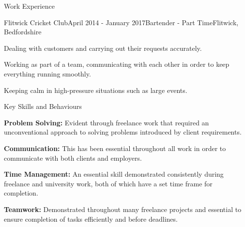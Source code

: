 \documentclass{resume} %
\begin{document}
\begin{rSection}{Work Experience}

\begin{rSubsection}{Flitwick Cricket Club}{April 2014 - January 2017}{Bartender - Part Time}{Flitwick, Bedfordshire}
\item Dealing with customers and carrying out their requests accurately.
\item Working as part of a team, communicating with each other in order to keep everything running smoothly.
\item Keeping calm in high-pressure situations such as large events.
\end{rSubsection}

\end{rSection}


\begin{rSectionList}{Key Skills and Behaviours}
\item \textbf{Problem Solving:}
Evident through freelance work that required an unconventional approach to solving problems introduced by client requirements.

\item \textbf{Communication:} 
This has been essential throughout all work in order to communicate with both clients and employers. 

\item \textbf{Time Management:}
An essential skill demonstrated consistently during freelance and university work, both of which have a set time frame for completion.

\item \textbf{Teamwork:}
Demonstrated throughout many freelance projects and essential to ensure completion of tasks efficiently and before deadlines.
\end{rSectionList}

\end{document}
